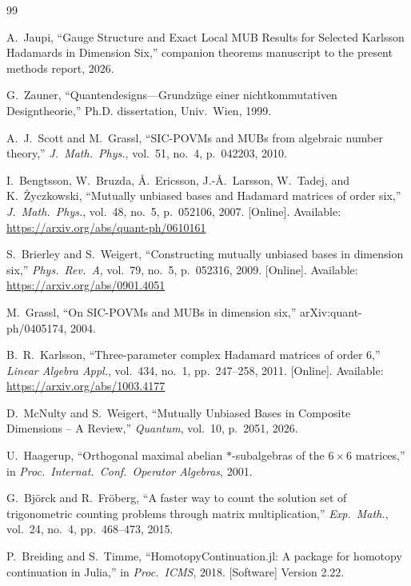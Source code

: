 \documentclass[onecolumn]{IEEEtran}
\begin{document}
\begin{thebibliography}{99}

A.~Jaupi, ``Gauge Structure and Exact Local MUB Results for Selected Karlsson Hadamards in Dimension Six,'' companion theorems manuscript to the present methods report, 2026.

G.~Zauner, ``Quantendesigns---Grundz\"uge einer nichtkommutativen Designtheorie,'' Ph.D. dissertation, Univ.\ Wien, 1999.

A.~J.~Scott and M.~Grassl, ``SIC-POVMs and MUBs from algebraic number theory,'' \emph{J.\ Math.\ Phys.}, vol.~51, no.~4, p.~042203, 2010.

I.~Bengtsson, W.~Bruzda, {\AA}.~Ericsson, J.-{\AA}.~Larsson, W.~Tadej, and K.~\.Zyczkowski, ``Mutually unbiased bases and Hadamard matrices of order six,'' \emph{J.\ Math.\ Phys.}, vol.~48, no.~5, p.~052106, 2007. [Online]. Available: \url{https://arxiv.org/abs/quant-ph/0610161}

S.~Brierley and S.~Weigert, ``Constructing mutually unbiased bases in dimension six,'' \emph{Phys.\ Rev.\ A}, vol.~79, no.~5, p.~052316, 2009. [Online]. Available: \url{https://arxiv.org/abs/0901.4051}

M.~Grassl, ``On SIC-POVMs and MUBs in dimension six,'' arXiv:quant-ph/0405174, 2004.

B.~R.~Karlsson, ``Three-parameter complex Hadamard matrices of order 6,'' \emph{Linear Algebra Appl.}, vol.~434, no.~1, pp.~247--258, 2011. [Online]. Available: \url{https://arxiv.org/abs/1003.4177}

D.~McNulty and S.~Weigert, ``Mutually Unbiased Bases in Composite Dimensions -- A Review,'' \emph{Quantum}, vol.~10, p.~2051, 2026.

U.~Haagerup, ``Orthogonal maximal abelian $*$-subalgebras of the $6\times6$ matrices,'' in \emph{Proc.\ Internat.\ Conf.\ Operator Algebras}, 2001.

G.~Bj\"orck and R.~Fr\"oberg, ``A faster way to count the solution set of trigonometric counting problems through matrix multiplication,'' \emph{Exp.\ Math.}, vol.~24, no.~4, pp.~468--473, 2015.

P.~Breiding and S.~Timme, ``HomotopyContinuation.jl: A package for homotopy continuation in Julia,'' in \emph{Proc.\ ICMS}, 2018. [Software] Version 2.22.

\end{thebibliography}
\end{document}
